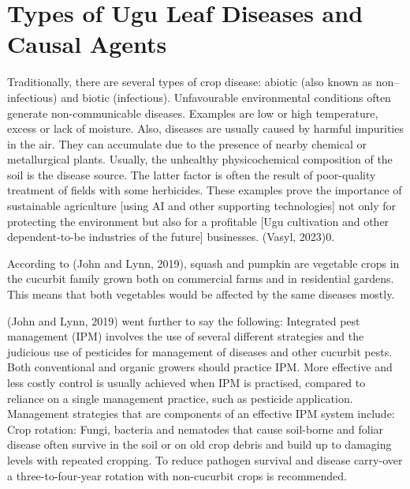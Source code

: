 \section{Types of Ugu Leaf Diseases and Causal Agents}
Traditionally, there are several types of crop disease: abiotic (also known as non--infectious) and biotic (infectious). Unfavourable environmental conditions often generate non-communicable diseases. Examples are low or high temperature, excess or lack of moisture. Also, diseases are usually caused by harmful impurities in the air. They can accumulate due to the presence of nearby chemical or metallurgical plants. Usually, the unhealthy physicochemical composition of the soil is the disease source. The latter factor is often the result of poor-quality treatment of fields with some herbicides. These examples prove the importance of sustainable agriculture [using AI and other supporting technologies] not only for protecting the environment but also for a profitable [Ugu cultivation and other dependent-to-be industries of the future] businesses. (Vasyl, 2023)0. 

According to (John and Lynn, 2019), squash and pumpkin are vegetable crops in the cucurbit family grown both on commercial farms and in residential gardens. This means that both vegetables would be affected by the same diseases mostly. 

(John and Lynn, 2019) went further to say the following: 
Integrated pest management (IPM) involves the use of several different strategies and the judicious use of pesticides for management of diseases and other cucurbit pests. Both conventional and organic growers should practice IPM. More effective and less costly control is usually achieved when IPM is practised, compared to reliance on a single management practice, such as pesticide application. Management strategies that are components of an effective IPM system include: 
Crop rotation: Fungi, bacteria and nematodes that cause soil-borne and foliar disease often survive in the soil or on old crop debris and build up to damaging levels with repeated cropping. To reduce pathogen survival and disease carry-over a three-to-four-year rotation with non-cucurbit crops is recommended. 

